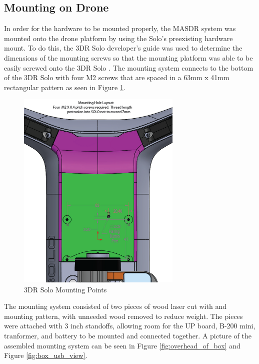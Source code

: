 \subsection{Mounting on Drone} \label{Mounting}
In order for the hardware to be mounted properly, the MASDR system was mounted onto the drone platform by using the Solo’s preexisting hardware mount. To do this, the 3DR Solo developer's guide was used to determine the dimensions of the mounting screws so that the mounting platform was able to be easily screwed onto the 3DR Solo \cite{3dr_devguide}. The mounting system connects to the bottom of the 3DR Solo with four M2 screws that are spaced in a 63mm x 41mm rectangular pattern as seen in Figure \ref{fig:solo_mount}.
\begin{figure}[ht]
\centering
\includegraphics[width=0.70\textwidth]{img/solo_mount_points.png}
\caption{3DR Solo Mounting Points}
\label{fig:solo_mount}
\end{figure} \par
The mounting system consisted of two pieces of wood laser cut with and mounting pattern, with unneeded wood removed to reduce weight. The pieces were attached with 3 inch standoffs, allowing room for the UP board, B-200 mini, tranformer, and battery to be mounted and connected together. A picture of the assembled mounting system can be seen in Figure \ref{fig:overhead_of_box} and Figure \ref{fig:box_usb_view}.

